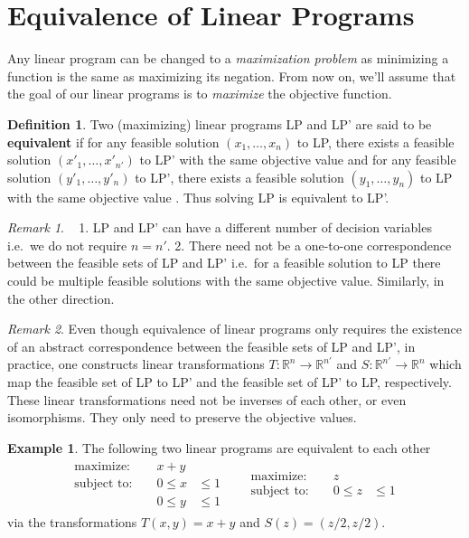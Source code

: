 \documentclass[
]{book}
\theoremstyle{definition}
\newtheorem{definition}{Definition}[chapter]
\theoremstyle{definition}
\newtheorem{example}{Example}[chapter]
\theoremstyle{definition}
\theoremstyle{definition}
\theoremstyle{remark}
\newtheorem*{remark}{Remark}
\begin{document}
\hypertarget{equivalence-of-linear-programs}{%
\section{Equivalence of Linear Programs}\label{equivalence-of-linear-programs}}

Any linear program can be changed to a \emph{maximization problem} as minimizing a function is the same as maximizing its negation. From now on, we'll assume that the goal of our linear programs is to \emph{maximize} the objective function.

\begin{definition}
Two (maximizing) linear programs LP and LP' are said to be \textbf{equivalent} if for any feasible solution \((x_1, \dots, x_n)\) to LP, there exists a feasible solution \((x'_1, \dots, x'_{n'})\) to LP' with the same objective value and for any feasible solution \((y'_1, \dots, y'_n)\) to LP', there exists a feasible solution \((y_1, \dots, y_{n})\) to LP with the same objective value . Thus solving LP is equivalent to LP'.
\end{definition}

\begin{remark}
~
1. LP and LP' can have a different number of decision variables i.e.~we do not require \(n = n'.\)
2. There need not be a one-to-one correspondence between the feasible sets of LP and LP' i.e.~for a feasible solution to LP there could be multiple feasible solutions with the same objective value. Similarly, in the other direction.
\end{remark}

\begin{remark}
Even though equivalence of linear programs only requires the existence of an abstract correspondence between the feasible sets of LP and LP', in practice, one constructs linear transformations \(T: \mathbb{R}^n \to \mathbb{R}^{n'}\) and \(S: \mathbb{R}^{n'} \to \mathbb{R}^{n}\) which map the feasible set of LP to LP' and the feasible set of LP' to LP, respectively. These linear transformations need not be inverses of each other, or even isomorphisms. They only need to preserve the objective values.
\end{remark}

\begin{example}
The following two linear programs are equivalent to each other
\begin{align*}
\begin{aligned}
  \mbox{maximize: } && x + y & \\
  \mbox{subject to: } && 0 \le x &\le 1 \\
     && 0 \le y &\le 1 
\end{aligned}
&&
\begin{aligned}
  \mbox{maximize: } && z & \\
  \mbox{subject to: } && 0 \le z &\le 1
\end{aligned}
\end{align*}
via the transformations \(T(x, y) = x + y\) and \(S(z) = (z/2, z/2)\).
\end{example}
\end{document}
